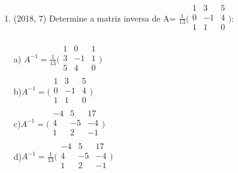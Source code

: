 \documentclass{article}
\begin{document}
\begin{enumerate}
como o $\cos{\theta}$ e negativo temos que o ângulo só pode estar no segundo quadrane e analisando as alternativas a única opção seroa 107\newline

e) -7; 107°\newline

\textbf{CONTEÚDO}

$\rule[1cm]{100cm}{1px}$

ÂNGULO ENTRE DOIS VETORES:
Através da definição de produto escalar, podemos obter o ângulo x entre dois vetores genéricos u e v:

$\vec u .\vec v=\cos{\theta}.|u|.|v|$


\newpage




\item (2018, 7) Determine a matriz inversa de A= $\frac{1}{13} \Bigg(
    \begin{array}{cccc}
    1 & 3 & 5\\
    0 & -1 & 4\\
    1 & 1 & 0 \\
\end{array}\Bigg):$\newline

a) $A^{-1}=\frac{1}{13} \Bigg(
    \begin{array}{cccc}
    1 & 0 & 1\\
    3 & -1 & 1\\
    5 & 4 & 0 \\
\end{array}\Bigg)$\\

b)$A^{-1}= \Bigg(
    \begin{array}{cccc}
    1 & 3 & 5\\
    0 & -1 & 4\\
    1 & 1 & 0 \\
\end{array}\Bigg)$\\

c)$A^{-1}=\Bigg(
    \begin{array}{cccc}
    -4 & 5 & 17\\
    4 & -5 & -4\\
    1 & 2 & -1 \\
\end{array}\Bigg)$\\

d)$A^{-1}=\frac{1}{13} \Bigg(
    \begin{array}{cccc}
    -4 & 5 & 17\\
    4 & -5 & -4\\
    1 & 2  & -1\\
\end{array}\Bigg)$\\


\end{enumerate}
\end{document}
